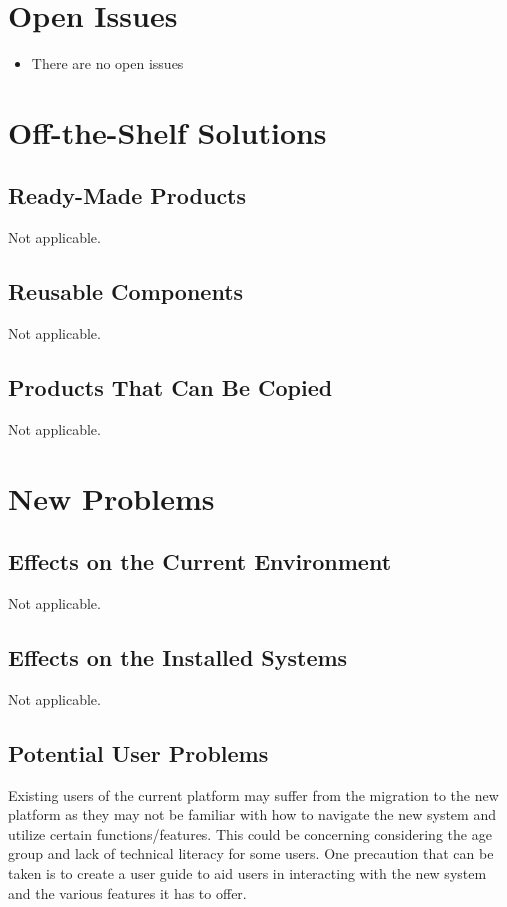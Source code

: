 \documentclass[12pt]{article}
\begin{document}
\section{Open Issues}

\begin{itemize}

  \item There are no open issues

\end{itemize}

\section{Off-the-Shelf Solutions}
\subsection{Ready-Made Products}
Not applicable.
\subsection{Reusable Components}
Not applicable.
\subsection{Products That Can Be Copied}
Not applicable.

\section{New Problems}
\subsection{Effects on the Current Environment}
Not applicable.
\subsection{Effects on the Installed Systems}
Not applicable.
\subsection{Potential User Problems}

Existing users of the current platform may suffer from the migration
to the new platform as they may not be familiar with how to navigate
the new system and utilize certain functions/features. This could be
concerning considering the age group and lack of technical literacy
for some users. One precaution that can be taken is to create a user
guide to aid users in interacting with the new system and the various
features it has to offer.
\end{document}
